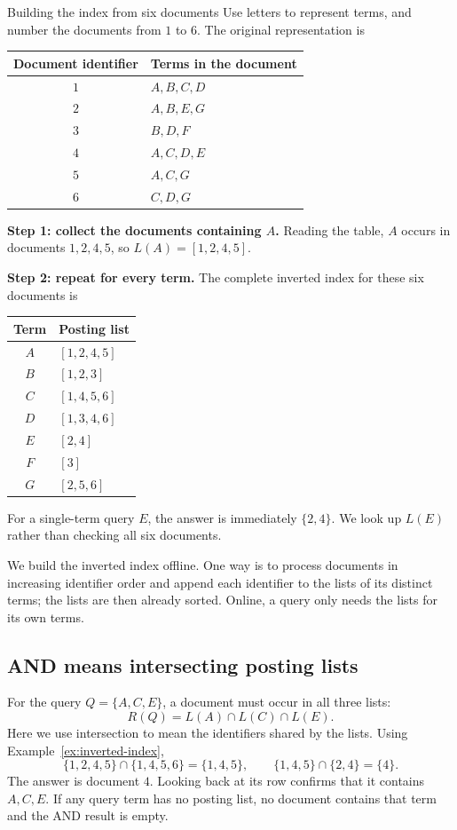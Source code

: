\documentclass[a4paper,12pt,oneside]{report}
\begin{document}
\begin{framedexample}{Building the index from six documents}\label{ex:inverted-index}
Use letters to represent terms, and number the documents from $1$ to
$6$. The original representation is
\begin{center}
\begin{tabular}{c|l}
  Document identifier & Terms in the document\\\hline
  $1$ & $A,B,C,D$\\
  $2$ & $A,B,E,G$\\
  $3$ & $B,D,F$\\
  $4$ & $A,C,D,E$\\
  $5$ & $A,C,G$\\
  $6$ & $C,D,G$
\end{tabular}
\end{center}
\textbf{Step 1: collect the documents containing $A$.}
Reading the table, $A$ occurs in documents $1,2,4,5$, so
$L(A)=[1,2,4,5]$.

\textbf{Step 2: repeat for every term.}
The complete inverted index for these six documents is
\begin{center}
\begin{tabular}{c|l}
  Term & Posting list\\\hline
  $A$ & $[1,2,4,5]$\\
  $B$ & $[1,2,3]$\\
  $C$ & $[1,4,5,6]$\\
  $D$ & $[1,3,4,6]$\\
  $E$ & $[2,4]$\\
  $F$ & $[3]$\\
  $G$ & $[2,5,6]$
\end{tabular}
\end{center}
For a single-term query $E$, the answer is immediately $\{2,4\}$.
We look up $L(E)$ rather than checking all six documents.
\end{framedexample}

We build the inverted index offline. One way is to process documents
in increasing identifier order and append each identifier to the
lists of its distinct terms; the lists are then already sorted.
Online, a query only needs the lists for its own terms.

\subsection{AND means intersecting posting lists}

For the query $Q=\{A,C,E\}$, a document must occur in all three lists:
\[
  R(Q)=L(A)\cap L(C)\cap L(E).
\]
Here we use intersection to mean the identifiers shared by the lists.
Using Example~\ref{ex:inverted-index},
\[
  \{1,2,4,5\}\cap\{1,4,5,6\}=\{1,4,5\},
  \qquad \{1,4,5\}\cap\{2,4\}=\{4\}.
\]
The answer is document $4$. Looking back at its row confirms that it
contains $A,C,E$. If any query term has no posting list, no document
contains that term and the AND result is empty.
\end{document}
